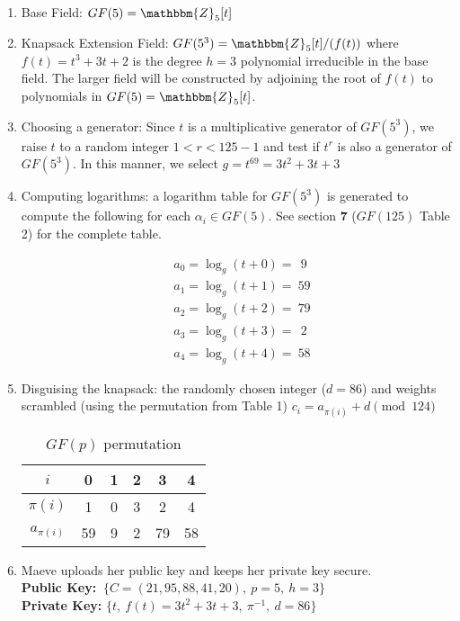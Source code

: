 \documentclass[12pt,a4paper,titlepage]{article}
\begin{document}
\begin{enumerate}
\item Base Field: $GF(5) = \mathbbm{Z}_5 [t]$

\item Knapsack Extension Field: $GF(5^3) = \mathbbm{Z}_5 [t] / (f(t))$ where $f(t) = t^3+ 3t + 2$ is the degree $h = 3$ polynomial irreducible in the base field. The larger field will be constructed by adjoining the root of $f(t)$ to polynomials in $GF(5) = \mathbbm{Z}_5 [t]$. 

\item Choosing a generator: Since $t$ is a multiplicative generator of $GF(5^3)$, we raise $t$ to a random integer $1 < r < 125 - 1$ and test if $t^r$ is also a generator of $GF(5^3)$. In this manner, we select $g = t^{69} = 3t^2 + 3t + 3$

\item  Computing logarithms: a logarithm table for $GF(5^3)$ is generated to compute the following for each $\alpha_i \in GF(5)$. See section \textbf{7} ($GF(125)$ Table 2) for the complete table.

\begin{align*}
&   a_0	= \log_g (t + 0) =\  \ 9 \\
&	a_1	= \log_g (t + 1) =\ 59 \\
&	a_2	= \log_g (t + 2) =\ 79 \\
&	a_3	= \log_g (t + 3) =\ \ 2 \\
&	a_4	= \log_g (t + 4) =\ 58
	\end{align*} 
	
\item Disguising the knapsack: the randomly chosen integer ($d = 86$) and weights scrambled (using the permutation from Table 1) $c_i = a_{\pi(i)} + d \pmod{124}$

\begin{table*}[h]
	\begin{center}
		\begin{tabular}{c|c|c|c|c|c} 
			$i$  & 0 & 1 & 2 & 3 & 4 \\ \hline
		$\pi(i)$ & 1 & 0 & 3 & 2 & 4 \\ \hline
   $a_{\pi(i)}$ & 59 & 9 & 2 & 79 & 58
		\end{tabular}
		\caption{$GF(p)$ permutation}
	\end{center}
	\end{table*}

\item Maeve uploads her public key and keeps her private key secure. \\ \textbf{Public Key:}  $\ \{ C = (21,95,88,41,20),\ p = 5,\ h = 3 \}$ \\ 
	   \textbf{Private Key:}  $\{t,\ f(t) = 3t^2 + 3t + 3,\ \pi^{-1},\ d = 86 \}$
	   
\end{enumerate}
\end{document}
